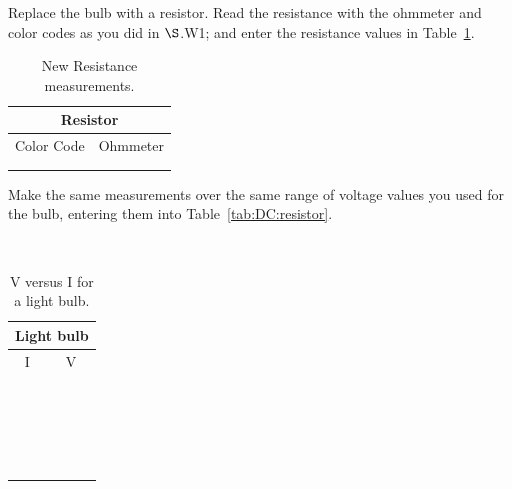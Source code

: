 \noindent Replace the bulb with a resistor.
Read the resistance with the ohmmeter and color codes as you did in 
$\S${\thechapter.W1}; and enter the resistance values in Table~\ref{tab:DC:newres}.  
\begin{table}[htb]
\begin{center}
\begin{tabular}{|c|c|}
\hline
\multicolumn{2}{|c|}{Resistor } \\
\hline 
Color Code & Ohmmeter \\ 
\hline
\hspace*{3cm} & \hspace*{3cm}  \\ 
&   \\ 
\hline
\end{tabular}
\end{center}
\caption{New Resistance measurements.}
\label{tab:DC:newres}
\end{table}

\pagebreak
\noindent Make the same measurements 
over the same range of voltage values you used for the bulb, entering
them into Table~\ref{tab:DC:resistor}.

\ \\
\vspace*{1cm}
\begin{table}[htb]
\begin{center}
\begin{tabular}{|c|c|}
\hline
\multicolumn{2}{|c|}{Light bulb}\\
\hline
I & V \\
\hline
\hspace*{5cm} & \hspace*{5cm} \\
& \\
\hline
& \\
& \\
\hline
& \\
& \\
\hline
& \\
& \\
\hline
& \\
& \\
\hline
& \\
& \\
\hline
& \\
& \\
\hline
& \\
& \\
\hline
& \\
& \\
\hline
& \\
& \\
\hline
\end{tabular}
\end{center}
\caption{V versus I for a light bulb.}
\label{tab:DC:lightbulb}
\end{table}

